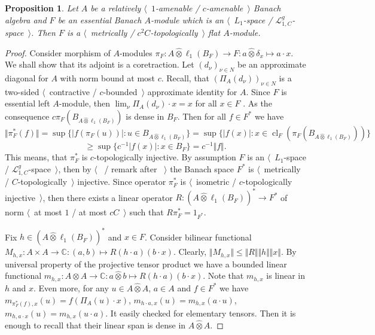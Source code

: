 \documentclass[12pt]{article}
\newtheorem{proposition}[theorem]{Proposition}
\newcommand{\projtens}{\mathbin{\widehat{\otimes}}}
\begin{document}
\begin{proposition}\label{MetTopEssL1FlatModAoverAmenBanAlg} Let $A$ be a relatively $\langle$~$1$-amenable / $c$-amenable~$\rangle$ Banach algebra and $F$ be an essential Banach $A$-module which is an $\langle$~$L_1$-space / $\mathcal{L}_{1,C}^g$-space~$\rangle$. Then $F$ is a $\langle$~metrically / $c^2C$-topologically~$\rangle$ flat $A$-module.
\end{proposition}
\begin{proof} Consider morphism of $A$-modules $\pi_F:A\projtens \ell_1(B_F)\to F:a\projtens \delta_x\mapsto a\cdot x$. We shall show that its adjoint is a coretraction. Let $(d_\nu)_{\nu\in N}$ be an approximate diagonal for $A$ with norm bound at most $c$. Recall, that $(\Pi_A(d_\nu))_{\nu\in N}$ is a two-sided $\langle$~contractive / $c$-bounded~$\rangle$ approximate identity for $A$. Since $F$ is essential left $A$-module, then $\lim_{\nu}\Pi_A(d_\nu)\cdot x=x$ for all $x\in F$ \cite[proposition 0.3.15]{HelHomolBanTopAlg}. As the consequence $c\pi_F(B_{A\projtens\ell_1(B_F)})$ is dense in $B_F$. Then for all $f\in F^*$ we have
\[
\Vert\pi_F^*(f)\Vert
=\sup\{|f(\pi_F(u))|:u\in B_{A\projtens\ell_1(B_F)}\}
=\sup\{|f(x)|:x\in \operatorname{cl}_F(\pi_F(B_{A\projtens\ell_1(B_F)}))\}
\]
\[
\geq\sup\{c^{-1}|f(x)|:x\in B_F\}=c^{-1}\Vert f\Vert.
\]
This means, that $\pi_F^*$ is $c$-topologically injective. By assumption $F$ is an $\langle$~$L_1$-space / $\mathcal{L}_{1,C}^g$-space~$\rangle$, then by $\langle$~\cite[theorem 1]{GrothMetrProjFlatBanSp} / remark after \cite[corollary 23.5(1)]{DefFloTensNorOpId}~$\rangle$ the Banach space $F^*$ is $\langle$~metrically / $C$-topologically~$\rangle$ injective. Since operator $\pi_F^*$ is $\langle$~isometric / $c$-topologically injective~$\rangle$, then there exists a linear operator $R:(A\projtens\ell_1(B_F))^*\to F^*$ of norm $\langle$~at most $1$ / at most $cC$~$\rangle$ such that $R\pi_F^*=1_{F^*}$.

Fix $h\in (A\projtens\ell_1(B_F))^*$ and $x\in F$. Consider bilinear functional $M_{h,x}:A\times A\to\mathbb{C}:(a,b)\mapsto R(h\cdot a)(b\cdot x)$. Clearly, $\Vert M_{h,x}\Vert\leq\Vert R\Vert\Vert h\Vert\Vert x\Vert$. By universal property of the projective tensor product we have a bounded linear functional $m_{h,x}:A\projtens A\to\mathbb{C}:a\projtens b\mapsto R(h\cdot a)(b\cdot x)$. Note that $m_{h,x}$ is linear in $h$ and $x$. Even more, for any $u\in A\projtens A$, $a\in A$ and $f\in F^*$ we have $m_{\pi_F^*(f),x}(u)=f(\Pi_A(u)\cdot x)$, $m_{h\cdot a,x}(u)=m_{h,x}(a\cdot u)$, $m_{h,a\cdot x}(u)=m_{h,x}(u\cdot a)$. It easily checked for elementary tensors. Then it is enough to recall that their linear span is dense in $A\projtens A$.


\end{proof}
\end{document}
